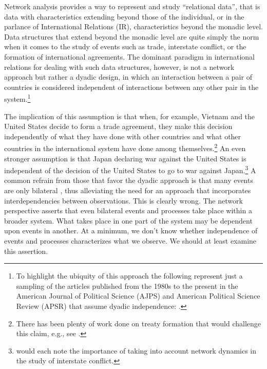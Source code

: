 Network analysis provides a way to represent and study ``relational data'', that is data with characteristics extending beyond those of the individual, or in the parlance of International Relations (IR), characteristics beyond the monadic level. Data structures that extend beyond the monadic level are quite simply the norm when it comes to the study of events such as trade, interstate conflict, or the formation of international agreements. The dominant paradigm in  international relations for dealing with such data structures, however, is not a network approach but rather a dyadic design, in which an interaction between a pair of countries is considered independent of interactions between any other pair in the system.\footnote{To highlight the ubiquity of this approach the following represent just a sampling of the articles published from the 1980s to the present in the American Journal of Political Science (AJPS) and American Political Science Review (APSR) that assume dyadic independence: \citet{dixon:1983,mansfield:etal:2000,lemke:reed:2001a,mitchell:2002,dafoe:2011a,fuhrmann:sechser:2014,carnegie:2014}.} 

The implication of this assumption is that when, for example, Vietnam and the United States decide to form a trade agreement, they make this decision independently of what they have done with other countries and what other countries in the international system have done among themselves.\footnote{There has been plenty of work done on treaty formation that would challenge this claim, e.g., see \citet{manger:etal:2012,kinne:2013}.} An even stronger assumption is that Japan declaring war against the United States is independent of the decision of the United States to go to war against Japan.\footnote{\citet{maoz:etal:2006,ward:etal:2007,minhas:etal:2016} would each note the importance of taking into account network dynamics in the study of interstate conflict.} A common refrain from those that favor the dyadic approach is that many events are only bilateral \citep{diehl:wright:2016}, thus alleviating the need for an approach that incorporates interdependencies between observations. This is clearly wrong. The network perspective asserts that even bilateral events and processes take place within a broader system. What takes place in one part of the system may be dependent upon events in another. At a minimum, we don't know whether independence of events and processes characterizes what we observe. We should at least examine this assertion.  

